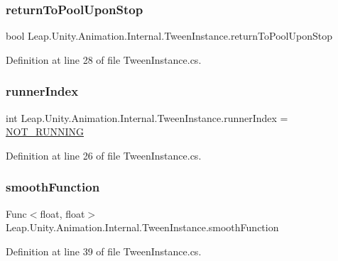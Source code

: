 \subsubsection{\texorpdfstring{returnToPoolUponStop}{returnToPoolUponStop}}
{\footnotesize\ttfamily bool Leap.\+Unity.\+Animation.\+Internal.\+Tween\+Instance.\+return\+To\+Pool\+Upon\+Stop}



Definition at line 28 of file Tween\+Instance.\+cs.

\mbox{\label{class_leap_1_1_unity_1_1_animation_1_1_internal_1_1_tween_instance_a5c88b5a5151ae7560a5a9be273381571}} 
\subsubsection{\texorpdfstring{runnerIndex}{runnerIndex}}
{\footnotesize\ttfamily int Leap.\+Unity.\+Animation.\+Internal.\+Tween\+Instance.\+runner\+Index = \mbox{\hyperlink{class_leap_1_1_unity_1_1_animation_1_1_internal_1_1_tween_instance_adbf5b01cdf875afcb36d51ca1183a159}{N\+O\+T\+\_\+\+R\+U\+N\+N\+I\+NG}}}



Definition at line 26 of file Tween\+Instance.\+cs.

\mbox{\label{class_leap_1_1_unity_1_1_animation_1_1_internal_1_1_tween_instance_afc81f28902aa844fe24e6ab98e23d35a}} 
\subsubsection{\texorpdfstring{smoothFunction}{smoothFunction}}
{\footnotesize\ttfamily Func$<$float, float$>$ Leap.\+Unity.\+Animation.\+Internal.\+Tween\+Instance.\+smooth\+Function}



Definition at line 39 of file Tween\+Instance.\+cs.

